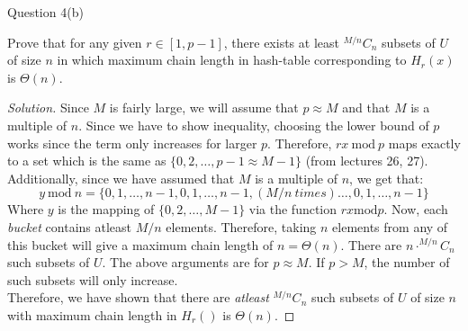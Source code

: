 \begin{solution}{Question 4(b)}\label{ques:4b}
    \begin{question}
        Prove that for any given $r \in [1, p-1]$, there exists at least $^{M/n}C_n$ subsets of $U$ of size $n$ in which maximum chain length in hash-table corresponding to $H_r(x)$ is $\Theta(n)$.
    \end{question}
    \tcblower{}
    \begin{proof}[Solution]
      Since $M$ is fairly large, we will assume that $p \approx M$ and that $M$ is a multiple of $n$. Since we have to show inequality, choosing the lower bound of $p$ works since the term only increases for larger $p$. Therefore, $rx\ \text{mod}\ p$ maps exactly to a set which is the same as $\{0, 2, \ldots, p-1 \approx M-1\}$ (from lectures 26, 27). Additionally, since we have assumed that $M$ is a multiple of $n$, we get that:
      \begin{equation}
        y\ \text{mod}\ n = \{0, 1, \ldots, n-1, 0, 1, \ldots, n-1, (M/n\ times)\ldots, 0, 1, \ldots, n-1\}
      \end{equation}
      Where $y$ is the mapping of $\{0, 2, \ldots, M-1\}$ via the function $rx \text{mod} p$. Now, each \textit{bucket} contains atleast $M/n$ elements. Therefore, taking $n$ elements from any of this bucket will give a maximum chain length of $n = \Theta(n)$. There are $n\cdot^{M/n}C_n$ such subsets of $U$. The above arguments are for $p \approx M$. If $p > M$, the number of such subsets will only increase.\\
      Therefore, we have shown that there are \textit{atleast} $^{M/n}C_n$ such subsets of $U$ of size $n$ with maximum chain length in $H_r()$ is $\Theta(n)$.
    \end{proof}
\end{solution}
